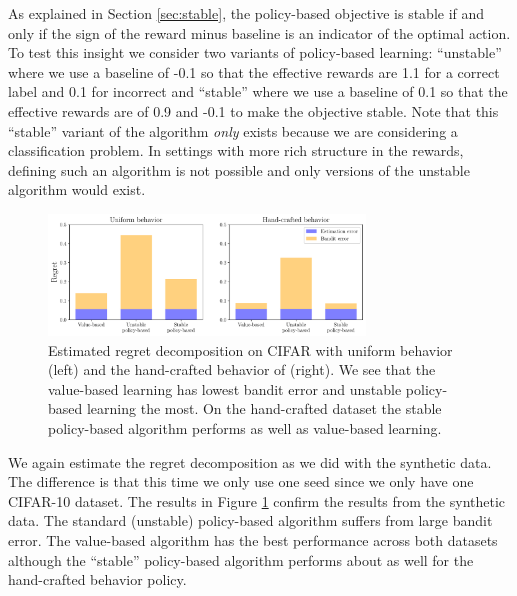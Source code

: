 As explained in Section \ref{sec:stable}, the policy-based objective is stable if and only if the sign of the reward minus baseline is an indicator of the optimal action. To test this insight we consider two variants of policy-based learning: ``unstable'' where we use a baseline of -0.1 so that the effective rewards are 1.1 for a correct label and 0.1 for incorrect and ``stable'' where we use a baseline of 0.1 so that the effective rewards are of 0.9 and -0.1 to make the objective stable. Note that this ``stable'' variant of the algorithm \emph{only} exists because we are considering a classification problem. In settings with more rich structure in the rewards, defining such an algorithm is not possible and only versions of the unstable algorithm would exist.

\begin{figure}
    \centering
    \includegraphics[width=0.75\textwidth]{figures/offline-bandits/cifar_regret_bar.pdf}
    \caption{Estimated regret decomposition on CIFAR with uniform behavior (left) and the hand-crafted behavior of \citet{joachims2018deep} (right). We see that the value-based learning has lowest bandit error and unstable policy-based learning the most. On the hand-crafted dataset the stable policy-based algorithm performs as well as value-based learning.}
    \label{fig:cifar_regret}
\end{figure}

We again estimate the regret decomposition as we did with the synthetic data. The difference is that this time we only use one seed since we only have one CIFAR-10 dataset. The results in Figure \ref{fig:cifar_regret} confirm the results from the synthetic data. The standard (unstable) policy-based algorithm suffers from large bandit error. The value-based algorithm has the best performance across both datasets although the ``stable'' policy-based algorithm performs about as well for the hand-crafted behavior policy.


